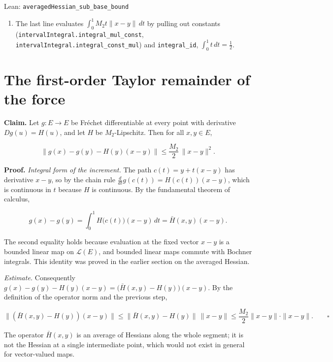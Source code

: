 \documentclass[11pt,a4paper]{article}
\begin{document}
\begin{leanbox}{Lean: \texttt{averagedHessian\_\allowbreak{}sub\_\allowbreak{}base\_\allowbreak{}bound}}
\begin{enumerate}
\item The last line evaluates \(\int_0^1M_2t\|x-y\|\,dt\) by pulling out constants (\texttt{interval\allowbreak{}Integral.\allowbreak{}integral\_\allowbreak{}mul\_\allowbreak{}const}, \texttt{interval\allowbreak{}Integral.\allowbreak{}integral\_\allowbreak{}const\_\allowbreak{}mul}) and \texttt{integral\_\allowbreak{}id}, \(\int_0^1t\,dt=\frac12\).

\end{enumerate}
\end{leanbox}

\section{\texorpdfstring{The first-order Taylor remainder of the force}{The first-order Taylor remainder of the force}}


\textbf{Claim.} Let \(g:E\to E\) be Fréchet differentiable at every point with derivative \(Dg(u)=H(u)\), and let \(H\) be \(M_2\)-Lipschitz. Then for all \(x,y\in E\),


\[\bigl\|g(x)-g(y)-H(y)(x-y)\bigr\|\le\frac{M_2}{2}\,\|x-y\|^2.\]


\textbf{Proof.} \emph{Integral form of the increment.} The path \(c(t)=y+t(x-y)\) has derivative \(x-y\), so by the chain rule \(\frac{d}{dt}g(c(t))=H(c(t))(x-y)\), which is continuous in \(t\) because \(H\) is continuous. By the fundamental theorem of calculus,


\[g(x)-g(y)=\int_0^1H\bigl(c(t)\bigr)(x-y)\,dt=\bar H(x,y)(x-y).\]


The second equality holds because evaluation at the fixed vector \(x-y\) is a bounded linear map on \(\mathcal L(E)\), and bounded linear maps commute with Bochner integrals. This identity was proved in the earlier section on the averaged Hessian.




\emph{Estimate.} Consequently \(g(x)-g(y)-H(y)(x-y)=\bigl(\bar H(x,y)-H(y)\bigr)(x-y)\). By the definition of the operator norm and the previous step,


\[\bigl\|(\bar H(x,y)-H(y))(x-y)\bigr\|\le\bigl\|\bar H(x,y)-H(y)\bigr\|\,\|x-y\|\le\frac{M_2}{2}\|x-y\|\cdot\|x-y\|.\qquad\square\]


The operator \(\bar H(x,y)\) is an average of Hessians along the whole segment; it is not the Hessian at a single intermediate point, which would not exist in general for vector-valued maps.
\end{document}
